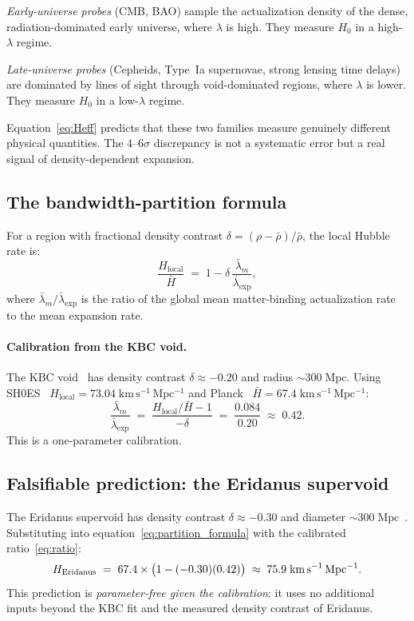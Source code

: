 \documentclass[11pt,twocolumn]{article}
\theoremstyle{plain}
\theoremstyle{remark}
\newcommand{\Hlocal}{H_{\mathrm{local}}}
\newcommand{\Hbar}{\bar{H}}
\newcommand{\lmb}{\bar{\lambda}_m}
\newcommand{\lexp}{\bar{\lambda}_{\mathrm{exp}}}
\begin{document}
\emph{Early-universe probes} (CMB, BAO) sample the actualization
density of the dense, radiation-dominated early universe, where
$\lambda$ is high.
They measure $H_0$ in a high-$\lambda$ regime.

\emph{Late-universe probes} (Cepheids, Type~Ia supernovae, strong
lensing time delays) are dominated by lines of sight through
void-dominated regions, where $\lambda$ is lower.
They measure $H_0$ in a low-$\lambda$ regime.

Equation~\eqref{eq:Heff} predicts that these two families measure
genuinely different physical quantities.
The $4$--$6\sigma$ discrepancy is not a systematic error but a real
signal of density-dependent expansion.

\subsection{The bandwidth-partition formula}

For a region with fractional density contrast
$\delta = (\rho - \bar\rho)/\bar\rho$, the local Hubble rate is:
\begin{equation}
  \frac{\Hlocal}{\Hbar} \;=\; 1 - \delta\,\frac{\lmb}{\lexp},
  \label{eq:partition_formula}
\end{equation}
where $\lmb/\lexp$ is the ratio of the global mean matter-binding
actualization rate to the mean expansion rate.

\paragraph{Calibration from the KBC void.}
The KBC void~\cite{Kenworthy2019} has density contrast
$\delta \approx -0.20$ and radius $\sim\!300\;\mathrm{Mpc}$.
Using SH0ES~\cite{Riess2022}
$\Hlocal = 73.04\;\mathrm{km\,s^{-1}\,Mpc^{-1}}$ and
Planck~\cite{Planck2020} $\Hbar = 67.4\;\mathrm{km\,s^{-1}\,Mpc^{-1}}$:
\begin{equation}
  \frac{\lmb}{\lexp}
  \;=\; \frac{\Hlocal/\Hbar - 1}{-\delta}
  \;=\; \frac{0.084}{0.20}
  \;\approx\; 0.42.
  \label{eq:ratio}
\end{equation}
This is a one-parameter calibration.

\subsection{Falsifiable prediction: the Eridanus supervoid}

The Eridanus supervoid has density contrast $\delta \approx -0.30$
and diameter $\sim\!300\;\mathrm{Mpc}$~\cite{Naidoo2016}.
Substituting into equation~\eqref{eq:partition_formula} with
the calibrated ratio~\eqref{eq:ratio}:
\begin{equation}
  H_{\rm Eridanus}
  \;=\; 67.4 \times \bigl(1 - (-0.30)(0.42)\bigr)
  \;\approx\; 75.9\;\mathrm{km\,s^{-1}\,Mpc^{-1}}.
  \label{eq:eridanus}
\end{equation}
This prediction is \emph{parameter-free given the calibration}:
it uses no additional inputs beyond the KBC fit and the measured
density contrast of Eridanus.
\end{document}
